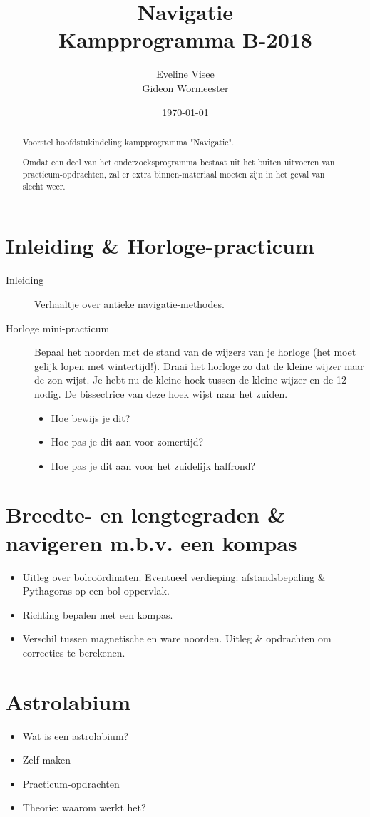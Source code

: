 \documentclass[a4paper,10pt]{article}
\title{Navigatie \\ Kampprogramma B-2018}
\author{Eveline Visee \\ Gideon Wormeester}
\date{\today}
\begin{document}
\maketitle

\begin{abstract}
Voorstel hoofdstukindeling kampprogramma "Navigatie".

Omdat een deel van het onderzoeksprogramma bestaat uit het buiten uitvoeren van practicum-opdrachten, zal er extra binnen-materiaal moeten zijn in het geval van slecht weer.
\end{abstract}

\section{Inleiding \& Horloge-practicum}
\begin{description}
 \item [Inleiding] Verhaaltje over antieke navigatie-methodes.
 \item [Horloge mini-practicum] Bepaal het noorden met de stand van de wijzers van je horloge (het moet gelijk lopen met wintertijd!). Draai het horloge zo dat de kleine wijzer naar de zon wijst. Je hebt nu de kleine hoek tussen de kleine wijzer en de 12 nodig. De bissectrice van deze hoek wijst naar het zuiden. 
 \begin{itemize}
  \item Hoe bewijs je dit?
  \item Hoe pas je dit aan voor zomertijd?
  \item Hoe pas je dit aan voor het zuidelijk halfrond?
 \end{itemize}
\end{description}

\section{Breedte- en lengtegraden \& navigeren m.b.v. een kompas}
\begin{itemize}
 \item Uitleg over bolco\"ordinaten. Eventueel verdieping: afstandsbepaling \& Pythagoras op een bol oppervlak.
 \item Richting bepalen met een kompas.
 \item Verschil tussen magnetische en ware noorden. Uitleg \& opdrachten om correcties te berekenen.
\end{itemize}

\section{Astrolabium}
\begin{itemize}
\item Wat is een astrolabium?
\item Zelf maken
\item Practicum-opdrachten
\item Theorie: waarom werkt het?
\end{itemize}
\end{document}
